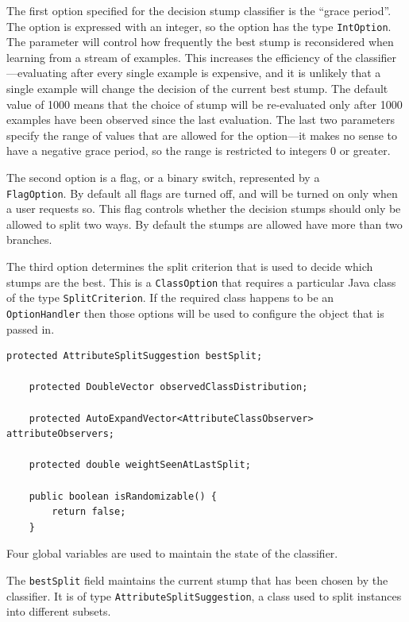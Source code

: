 \documentclass[a4paper,12pt,twoside]{book}
\begin{document}
The first option specified for the decision stump classifier is the ``grace period''. The option is expressed with an integer, so the option has the type \verb+IntOption+. The parameter will control how frequently the best stump is reconsidered when learning from a stream of examples. This increases the efficiency of the classifier---evaluating after every single example is expensive, and it is unlikely that a single example will change the decision of the current best stump. The default value of 1000 means that the choice of stump will be re-evaluated only after 1000 examples have been observed since the last evaluation. The last two parameters specify the range of values that are allowed for the option---it makes no sense to have a negative grace period, so the range is restricted to integers 0 or greater.

The second option is a flag, or a binary switch, represented by a \\ \verb+FlagOption+. By default all flags are turned off, and will be turned on only when a user requests so. This flag controls whether the decision stumps should only be allowed to split two ways. By default the stumps are allowed have more than two branches.

The third option determines the split criterion that is used to decide which stumps are the best. This is a \verb+ClassOption+ that requires a particular Java class of the type \verb+SplitCriterion+. If the required class happens to be an \verb+OptionHandler+ then those options will be used to configure the object that is passed in.

\begin{lstlisting}[caption={Miscellaneous fields},label=lst:miscfields,firstnumber=25]
	protected AttributeSplitSuggestion bestSplit;

	protected DoubleVector observedClassDistribution;

	protected AutoExpandVector<AttributeClassObserver> attributeObservers;

	protected double weightSeenAtLastSplit;

	public boolean isRandomizable() {
		return false;
	}
\end{lstlisting}

Four global variables are used to maintain the state of the classifier.

The \verb+bestSplit+ field maintains the current stump that has been chosen by the classifier. It is of type \verb+AttributeSplitSuggestion+, a class used to split instances into different subsets.
\end{document}
